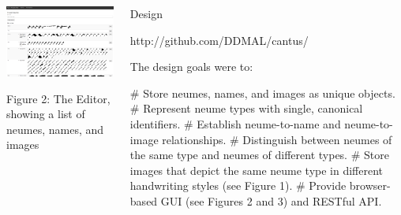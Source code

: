 \documentclass[final]{beamer}
\newlength{\onecolwid}
\newcommand{\blockSpace}{\vskip 0.75ex}
\begin{document}
\begin{frame}[fragile,t]
\begin{columns}
\begin{column}{\onecolwid}
\begin{block}{}
\centering
\includegraphics[width=\onecolwid]{images/neume-list-interface_cropped.png} 

Figure 2: The Editor, showing a list of neumes, names, and images
\end{block}
\end{column}

\begin{column}{\onecolwid}
\begin{block}{Design}
\begin{center}
\vspace{-0.25\baselineskip}
\small{http://github.com/DDMAL/cantus/}
\normalsize
\vspace{0.25\baselineskip}
\end{center}

\raggedright

The design goals were to:

\begin{easylist}[itemize]
# Store neumes, names, and images as unique objects.
# Represent neume types with single, canonical identifiers.
# Establish neume-to-name and neume-to-image relationships.
# Distinguish between neumes of the same type and neumes of different types.
# Store images that depict the same neume type in different handwriting styles (see Figure 1).
# Provide browser-based GUI (see Figures 2 and 3) and RESTful API.
\end{easylist}

\end{block}



\end{column}
\end{columns}
\end{frame}
\end{document}

